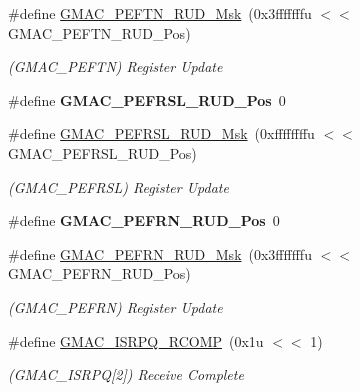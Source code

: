 \begin{DoxyCompactItemize}
\#define \mbox{\hyperlink{group__SAME70__GMAC_ga7d8238d107b30d94774eb27bb50baf02}{G\+M\+A\+C\+\_\+\+P\+E\+F\+T\+N\+\_\+\+R\+U\+D\+\_\+\+Msk}}~(0x3fffffffu $<$$<$ G\+M\+A\+C\+\_\+\+P\+E\+F\+T\+N\+\_\+\+R\+U\+D\+\_\+\+Pos)
\begin{DoxyCompactList}\small\item\em (G\+M\+A\+C\+\_\+\+P\+E\+F\+TN) Register Update \end{DoxyCompactList}\item 
\mbox{\label{group__SAME70__GMAC_ga14f3070613f00df9a4a459f3c71e28e6}} 
\#define {\bfseries G\+M\+A\+C\+\_\+\+P\+E\+F\+R\+S\+L\+\_\+\+R\+U\+D\+\_\+\+Pos}~0
\item 
\mbox{\label{group__SAME70__GMAC_ga38c6f5b7e50672e5c6297b2dde737c68}} 
\#define \mbox{\hyperlink{group__SAME70__GMAC_ga38c6f5b7e50672e5c6297b2dde737c68}{G\+M\+A\+C\+\_\+\+P\+E\+F\+R\+S\+L\+\_\+\+R\+U\+D\+\_\+\+Msk}}~(0xffffffffu $<$$<$ G\+M\+A\+C\+\_\+\+P\+E\+F\+R\+S\+L\+\_\+\+R\+U\+D\+\_\+\+Pos)
\begin{DoxyCompactList}\small\item\em (G\+M\+A\+C\+\_\+\+P\+E\+F\+R\+SL) Register Update \end{DoxyCompactList}\item 
\mbox{\label{group__SAME70__GMAC_ga1f934d2346d0283b55bf36c154a51e83}} 
\#define {\bfseries G\+M\+A\+C\+\_\+\+P\+E\+F\+R\+N\+\_\+\+R\+U\+D\+\_\+\+Pos}~0
\item 
\mbox{\label{group__SAME70__GMAC_gac0dda0ceeba4ae72c448f69847e241f7}} 
\#define \mbox{\hyperlink{group__SAME70__GMAC_gac0dda0ceeba4ae72c448f69847e241f7}{G\+M\+A\+C\+\_\+\+P\+E\+F\+R\+N\+\_\+\+R\+U\+D\+\_\+\+Msk}}~(0x3fffffffu $<$$<$ G\+M\+A\+C\+\_\+\+P\+E\+F\+R\+N\+\_\+\+R\+U\+D\+\_\+\+Pos)
\begin{DoxyCompactList}\small\item\em (G\+M\+A\+C\+\_\+\+P\+E\+F\+RN) Register Update \end{DoxyCompactList}\item 
\mbox{\label{group__SAME70__GMAC_ga6ea3a16f5160bc326bd2acb3d06fbfb8}} 
\#define \mbox{\hyperlink{group__SAME70__GMAC_ga6ea3a16f5160bc326bd2acb3d06fbfb8}{G\+M\+A\+C\+\_\+\+I\+S\+R\+P\+Q\+\_\+\+R\+C\+O\+MP}}~(0x1u $<$$<$ 1)
\begin{DoxyCompactList}\small\item\em (G\+M\+A\+C\+\_\+\+I\+S\+R\+PQ\mbox{[}2\mbox{]}) Receive Complete \end{DoxyCompactList}\item 

\end{DoxyCompactItemize}
